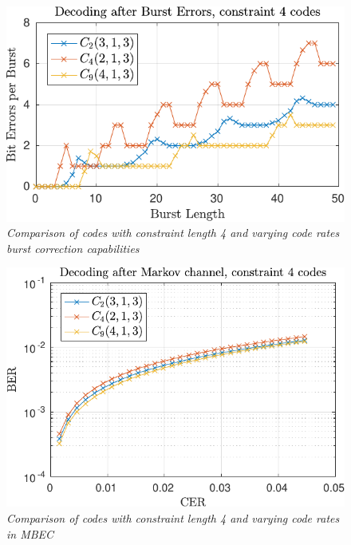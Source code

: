 \begin{figure}
\centering
\includegraphics[scale=1]{../figures/const4burst.pdf} 
\caption{\textit{Comparison of codes with constraint length 4 and varying code rates burst correction capabilities}\label{fig:constantContraintBurstFigure}}	
\end{figure}

\begin{figure}
\centering
\includegraphics[scale=1]{../figures/const4markov.pdf} 
\caption{\textit{Comparison of codes with constraint length 4 and varying code rates in MBEC}\label{fig:constantContraintMarkovFigure}}
\end{figure}